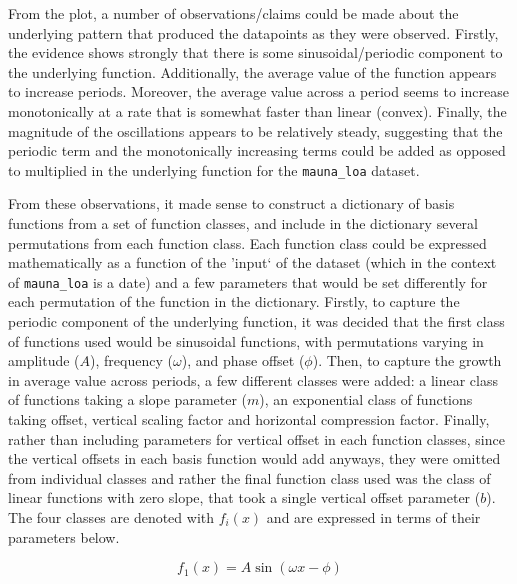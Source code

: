 \documentclass{article}
\begin{document}

From the plot, a number of observations/claims could be made about the underlying pattern that produced the datapoints as they were observed. Firstly, the evidence shows strongly that there is some sinusoidal/periodic component to the underlying function. Additionally, the average value of the function appears to increase periods. Moreover, the average value across a period seems to increase monotonically at a rate that is somewhat faster than linear (convex). Finally, the magnitude of the oscillations appears to be relatively steady, suggesting that the periodic term and the monotonically increasing terms could be added as opposed to multiplied in the underlying function for the \verb+mauna_loa+ dataset.

From these observations, it made sense to construct a dictionary of basis functions from a set of function classes, and include in the dictionary several permutations from each function class. Each function class could be expressed mathematically as a function of the 'input` of the dataset (which in the context of \verb+mauna_loa+ is a date) and a few parameters that would be set differently for each permutation of the function in the dictionary. Firstly, to capture the periodic component of the underlying function, it was decided that the first class of functions used would be sinusoidal functions, with permutations varying in amplitude ($A$), frequency ($\omega$), and phase offset ($\phi$). Then, to capture the growth in average value across periods, a few different classes were added: a linear class of functions taking a slope parameter ($m$), an exponential class of functions taking offset, vertical scaling factor and horizontal compression factor.
Finally, rather than including parameters for vertical offset in each function classes, since the vertical offsets in each basis function would add anyways, they were omitted from individual classes and rather the final function class used was the class of linear functions with zero slope, that took a single vertical offset parameter ($b$). The four classes are denoted with $f_i(x)$ and are expressed in terms of their parameters below.

\begin{equation}
f_1(x) = A \sin(\omega x - \phi)
\end{equation}
\end{document}
